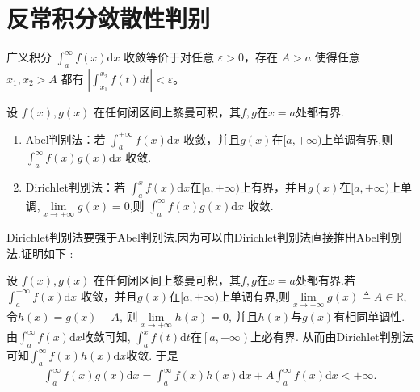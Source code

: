\documentclass[../../main.tex]{subfiles}
\begin{document}
\section{反常积分敛散性判别}

\begin{theorem}[Cauchy收敛准则]
广义积分 \(\int_{a}^{\infty} f(x) \mathrm{d}x\) 收敛等价于对任意 \(\varepsilon > 0\)，存在 \(A > a\) 使得任意 \(x_1,x_2 > A\) 都有 \(\left|\int_{x_1}^{x_2} f(t) dt\right| < \varepsilon\)。 
\end{theorem}

\begin{theorem}[A-D判别法]\label{theorem:A-D判别法}
设 \(f(x),g(x)\) 在任何闭区间上黎曼可积，其$f,g$在$x=a$处都有界.
\begin{enumerate}
\item {\heiti Abel判别法}：若 \(\int_{a}^{+\infty} f(x) \mathrm{d}x\) 收敛，并且$g(x)$在$[a,+\infty)$上单调有界,则 \(\int_{a}^{\infty} f(x)g(x) \mathrm{d}x\) 收敛.

\item {\heiti Dirichlet判别法}：若 \(\int_{a}^{x} f(x) \mathrm{d}x\)在$[a,+\infty)$上有界，并且\(g(x)\)在\([a,+\infty)\)上单调,$\underset{x\rightarrow +\infty}{\lim}g\left( x \right) =0$,则 \(\int_{a}^{\infty} f(x)g(x) \mathrm{d}x\) 收敛.
\end{enumerate}
\end{theorem}
\begin{remark}
Dirichlet判别法要强于Abel判别法.因为可以由Dirichlet判别法直接推出Abel判别法.证明如下 :

设 \(f(x),g(x)\) 在任何闭区间上黎曼可积，其$f,g$在$x=a$处都有界.若 \(\int_{a}^{+\infty} f(x) \mathrm{d}x\) 收敛，并且$g(x)$在$[a,+\infty)$上单调有界,则$\lim\limits_{x\rightarrow +\infty}g\left( x \right) \triangleq A\in \mathbb{R} $, 令$h\left( x \right) =g\left( x \right) -A$, 则$\lim\limits_{x\rightarrow +\infty}h\left( x \right) =0$, 并且$h\left( x \right) $与$g\left( x \right) $有相同单调性. 由$\int_a^{\infty}{f\left( x \right)}\mathrm{d}x$收敛可知, $\int_a^x{f\left( t \right)}\mathrm{d}t$在$\left[ a,+\infty \right) $上必有界. 从而由Dirichlet判别法可知$\int_a^{\infty}{f\left( x \right) h\left( x \right)}\mathrm{d}x$收敛. 于是
\begin{align*}
\int_a^{\infty}{f\left( x \right) g\left( x \right)}\mathrm{d}x=\int_a^{\infty}{f\left( x \right) h\left( x \right)}\mathrm{d}x+A\int_a^{\infty}{f\left( x \right)}\mathrm{d}x<+\infty .
\end{align*}
\end{remark}
\end{document}
